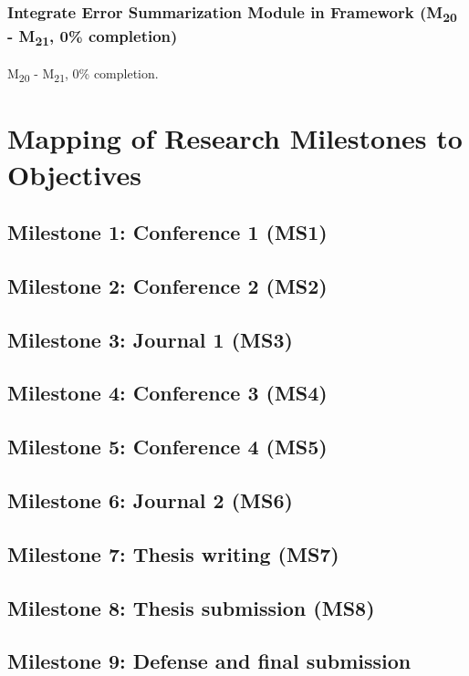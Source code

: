 \subsubsection{Integrate Error Summarization Module in Framework (M\textsubscript{20} - M\textsubscript{21}, 0\% completion)}
M\textsubscript{20} - M\textsubscript{21}, 0\% completion.

\section{Mapping of Research Milestones to Objectives}
\subsection{Milestone 1: Conference 1 (MS1)}
\subsection{Milestone 2: Conference 2 (MS2)}
\subsection{Milestone 3: Journal 1 (MS3)}
\subsection{Milestone 4: Conference 3 (MS4)}
\subsection{Milestone 5: Conference 4 (MS5)} 

\subsection{Milestone 6: Journal 2 (MS6)}
\subsection{Milestone 7: Thesis writing (MS7)}
\subsection{Milestone 8: Thesis submission (MS8)}
\subsection{Milestone 9: Defense and final submission}


